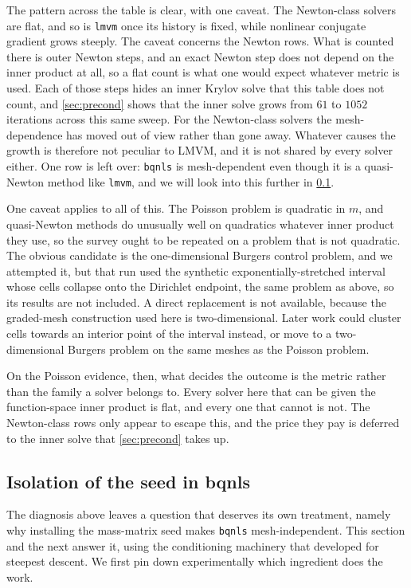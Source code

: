 \documentclass[a4paper,11pt]{article}
\theoremstyle{spacedplain} \newtheorem{theorem}[counter]{Theorem} \newtheorem{lemma}[counter]{Lemma} \newtheorem{prop}[counter]{Proposition} \newtheorem{cor}[counter]{Corollary}
\theoremstyle{spaceddefinition} \newtheorem{defn}[counter]{Definition} \newtheorem{example}[counter]{Example} \newtheorem{remark}[counter]{Remark}
\begin{document}
The pattern across the table is clear, with one caveat. The Newton-class solvers are flat, and so is \texttt{lmvm} once its history is fixed, while nonlinear conjugate gradient grows steeply. The caveat concerns the Newton rows. What is counted there is outer Newton steps, and an exact Newton step does not depend on the inner product at all, so a flat count is what one would expect whatever metric is used. Each of those steps hides an inner Krylov solve that this table does not count, and \cref{sec:precond} shows that the inner solve grows from $61$ to $1052$ iterations across this same sweep. For the Newton-class solvers the mesh-dependence has moved out of view rather than gone away. Whatever causes the growth is therefore not peculiar to LMVM, and it is not shared by every solver either. One row is left over: \texttt{bqnls} is mesh-dependent even though it is a quasi-Newton method like \texttt{lmvm}, and we will look into this further in \cref{sec:meshdep:bqnls-isolation}.

One caveat applies to all of this. The Poisson problem is quadratic in $m$, and quasi-Newton methods do unusually well on quadratics whatever inner product they use, so the survey ought to be repeated on a problem that is not quadratic. The obvious candidate is the one-dimensional Burgers control problem, and we attempted it, but that run used the synthetic exponentially-stretched interval whose cells collapse onto the Dirichlet endpoint, the same problem as above, so its results are not included. A direct replacement is not available, because the graded-mesh construction used here is two-dimensional. Later work could cluster cells towards an interior point of the interval instead, or move to a two-dimensional Burgers problem on the same meshes as the Poisson problem.

On the Poisson evidence, then, what decides the outcome is the metric rather than the family a solver belongs to. Every solver here that can be given the function-space inner product is flat, and every one that cannot is not. The Newton-class rows only appear to escape this, and the price they pay is deferred to the inner solve that \cref{sec:precond} takes up.

\subsection{Isolation of the seed in bqnls}
\label{sec:meshdep:bqnls-isolation}

The diagnosis above leaves a question that deserves its own treatment, namely why installing the mass-matrix seed makes \texttt{bqnls} mesh-independent. This section and the next answer it, using the conditioning machinery that \citet[Sect.~2.2]{shfp2017} developed for steepest descent. We first pin down experimentally which ingredient does the work.
\end{document}
